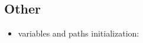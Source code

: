 \subsection{Other}
\begin{itemize}
\item \healpix variables and paths initialization: 
\end{itemize}


%  
% 
% 
